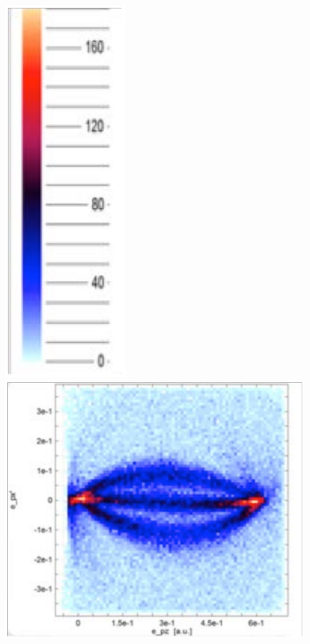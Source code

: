 \documentclass[12pt]{article}
\begin{document}
\begin{figure}
\begin{center}
\includegraphics[scale=0.4]{figures/HeExp_results2a}
\includegraphics[scale=0.4]{figures/HeExp_results2b}

\end{center}
\end{figure}
\end{document}
